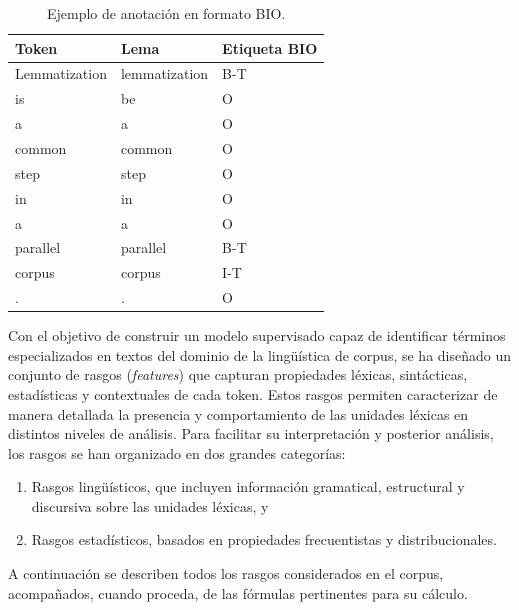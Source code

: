 \begin{table}[H]
\centering
\begin{tabular}{@{}lll@{}}
\toprule
\textbf{Token} & \textbf{Lema} & \textbf{Etiqueta BIO} \\
\midrule
Lemmatization   & lemmatization         & B-T \\
is              & be                    & O   \\
a               & a                     & O   \\
common          & common                & O   \\
step            & step                  & O   \\
in              & in                    & O   \\
a               & a                     & O   \\
parallel        & parallel              & B-T \\
corpus          & corpus                & I-T \\
.               & .                     & O   \\
\bottomrule
\end{tabular}
\caption{Ejemplo de anotación en formato BIO.}
\label{tab:bio_example}
\end{table}

Con el objetivo de construir un modelo supervisado capaz de identificar términos especializados en textos del dominio de la lingüística de corpus, se ha diseñado un conjunto de rasgos (\emph{features}) que capturan propiedades léxicas, sintácticas, estadísticas y contextuales de cada token. Estos rasgos permiten caracterizar de manera detallada la presencia y comportamiento de las unidades léxicas en distintos niveles de análisis. Para facilitar su interpretación y posterior análisis, los rasgos se han organizado en dos grandes categorías:

\begin{enumerate}
    \item Rasgos lingüísticos, que incluyen información gramatical, estructural y discursiva sobre las unidades léxicas, y
    \item Rasgos estadísticos, basados en propiedades frecuentistas y distribucionales.
\end{enumerate}
    
A continuación se describen todos los rasgos considerados en el corpus, acompañados, cuando proceda, de las fórmulas pertinentes para su cálculo.

